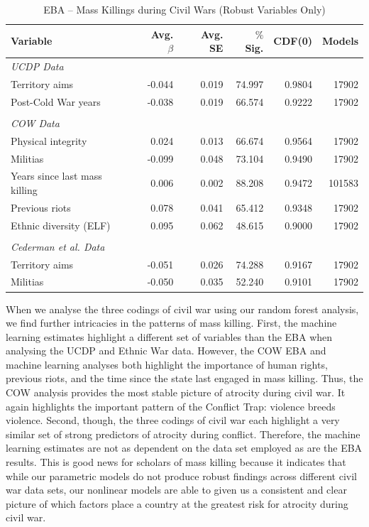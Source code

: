 \documentclass[a4paper,12pt]{article}
\begin{document}
\newpage

\begin{table}[H]
\centering
\begin{tabular}{lrrrrr}
\hline
\textbf{Variable} & \textbf{Avg. $\beta$} & \textbf{Avg. SE} & \textbf{$\%$ Sig.} & \textbf{CDF(0)} & \textbf{Models} \\ \hline
\textit{UCDP Data} &  &  &  &  &  \\
Territory aims & -0.044 & 0.019 & 74.997 & 0.9804 & 17902 \\
Post-Cold War years & -0.038 & 0.019 & 66.574 & 0.9222 & 17902 \\
 &  &  &  &  &  \\
\textit{COW Data} &  &  &  &  &  \\
Physical integrity & 0.024 & 0.013 & 66.674 & 0.9564 & 17902 \\
Militias & -0.099 & 0.048 & 73.104 & 0.9490 & 17902 \\
Years since last mass killing & 0.006 & 0.002 & 88.208 & 0.9472 & 101583 \\
Previous riots & 0.078 & 0.041 & 65.412 & 0.9348 & 17902 \\
Ethnic diversity (ELF) & 0.095 & 0.062 & 48.615 & 0.9000 & 17902 \\
& & & & \\
\textit{Cederman et al. Data} &  &  &  &  &  \\
Territory aims & -0.051 & 0.026 & 74.288 & 0.9167 & 17902 \\
Militias & -0.050 & 0.035 & 52.240 & 0.9101 & 17902 \\ \hline
\end{tabular}
\caption{EBA -- Mass Killings during Civil Wars (Robust Variables Only)}
\label{tab:ucdp}
\end{table}
	
When we analyse the three codings of civil war using our random forest analysis, we find further intricacies in the patterns of mass killing. First, the machine learning estimates highlight a different set of variables than the EBA when analysing the UCDP and Ethnic War data. However, the COW EBA and machine learning analyses both highlight the importance of human rights, previous riots, and the time since the state last engaged in mass killing. Thus, the COW analysis provides the most stable picture of atrocity during civil war. It again highlights the important pattern of the Conflict Trap: violence breeds violence. Second, though, the three codings of civil war each highlight a very similar set of strong predictors of atrocity during conflict. Therefore, the machine learning estimates are not as dependent on the data set employed as are the EBA results. This is good news for scholars of mass killing because it indicates that while our parametric models do not produce robust findings across different civil war data sets, our nonlinear models are able to given us a consistent and clear picture of which factors place a country at the greatest risk for atrocity during civil war. 
\end{document}
